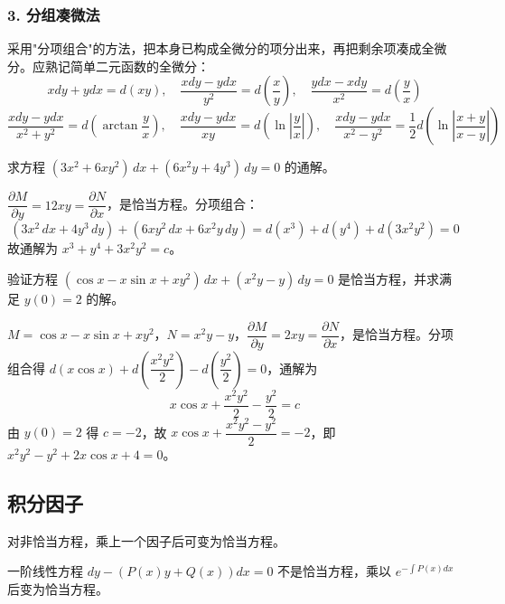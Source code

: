 \subsubsection{3. 分组凑微法}

采用"分项组合"的方法，把本身已构成全微分的项分出来，再把剩余项凑成全微分。应熟记简单二元函数的全微分：
$$xdy + ydx = d(xy), \quad \frac{xdy - ydx}{y^2} = d\left(\frac{x}{y}\right), \quad \frac{ydx - xdy}{x^2} = d\left(\frac{y}{x}\right)$$
$$\frac{xdy - ydx}{x^2 + y^2} = d\left(\arctan\frac{y}{x}\right), \quad \frac{xdy - ydx}{xy} = d\left(\ln\left|\frac{y}{x}\right|\right), \quad \frac{xdy - ydx}{x^2 - y^2} = \frac{1}{2}d\left(\ln\left|\frac{x+y}{x-y}\right|\right)$$

\begin{example}
求方程 $(3x^2 + 6xy^2)\,dx + (6x^2y + 4y^3)\,dy = 0$ 的通解。
\end{example}

\begin{solution}
$\dfrac{\partial M}{\partial y} = 12xy = \dfrac{\partial N}{\partial x}$，是恰当方程。分项组合：
$$(3x^2\,dx + 4y^3\,dy) + (6xy^2\,dx + 6x^2y\,dy) = d(x^3) + d(y^4) + d(3x^2y^2) = 0$$
故通解为 $x^3 + y^4 + 3x^2y^2 = c$。
\end{solution}

\begin{example}
验证方程 $(\cos x - x\sin x + xy^2)\,dx + (x^2y - y)\,dy = 0$ 是恰当方程，并求满足 $y(0) = 2$ 的解。
\end{example}

\begin{solution}
$M = \cos x - x\sin x + xy^2$，$N = x^2y - y$，$\dfrac{\partial M}{\partial y} = 2xy = \dfrac{\partial N}{\partial x}$，是恰当方程。分项组合得 $d(x\cos x) + d\left(\dfrac{x^2y^2}{2}\right) - d\left(\dfrac{y^2}{2}\right) = 0$，通解为
$$x\cos x + \frac{x^2y^2}{2} - \frac{y^2}{2} = c$$
由 $y(0) = 2$ 得 $c = -2$，故 $x\cos x + \dfrac{x^2y^2 - y^2}{2} = -2$，即 $x^2y^2 - y^2 + 2x\cos x + 4 = 0$。
\end{solution}

\subsection{积分因子}

对非恰当方程，乘上一个因子后可变为恰当方程。

\begin{example}
一阶线性方程 $dy - (P(x)y + Q(x))dx = 0$ 不是恰当方程，乘以 $e^{-\int P(x)dx}$ 后变为恰当方程。
\end{example}

